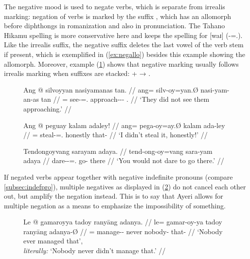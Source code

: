 The negative mood is used to negate verbs, which is separate from irrealis
marking: negation of verbs is marked by the suffix , which has
an allomorph  before diphthongs in romanization and also in
pronunciation. The Tahano Hikamu spelling is more conservative here and keeps
the spelling   for [waɪ]
(\mbox{-\Neg{}=\Fsg{}.\Top{}}). Like the irrealis suffix, the
negative suffix deletes the last vowel of the verb stem if present, which is
exemplified in (\ref{ex:negallo}) besides this example showing the 
allomorph. Moreover, example (\ref{ex:irrneg}) shows that negative marking
usually follows irrealis marking when suffixes are stacked:  +
 → .

\begin{figure}[h]
\pex
\a\label{ex:negative}\begingl
	\gla Ang @ silvoyyan nasiyamanas tan. //
	\glb ang= silv-oy=yan.Ø nasi-yam-an-as tan //
	\glc \AgtT{}= see-\Neg{}=\TplM{}.\Top{} approach-\Ptcp{}-\Nmlz{}-\Parg{} 
		\TplM{}.\Gen{} //
	\glft `They did not see them approaching.' //
\endgl

\a\label{ex:negallo}\begingl
	\gla Ang @ peguay kalam adaley! //
	\glb ang= pega-oy=ay.Ø kalam ada-ley //
	\glc \AgtT{}= steal-\Neg{}=\Fsg{}.\Top{} honestly that-\PargI{} //
	\glft `I didn't steal it, honestly!' //
\endgl

\a\label{ex:irrneg}\begingl
	\gla Tendongoyvang sarayam adaya. //
	\glb tend-ong-oy=vang sara-yam adaya //
	\glc dare-\Irr{}-\Neg{}=\Second{}.\Aarg{} go-\Ptcp{} there //
	\glft `You would not dare to go there.' //
\endgl
\xe
\end{figure}

If negated verbs appear together with negative indefinite pronouns (compare 
\autoref{subsec:indefpro}), multiple negatives as displayed in
(\ref{ex:dblneg}) do not cancel each other out, but amplify the negation
instead. This is to say that Ayeri allows for multiple
negation as a means to emphasize the impossibility of something.

\begin{figure}[h]
\ex\label{ex:dblneg}
\begingl
	\gla Le @ gamaroyya tadoy ranyāng adanya. //
	\glb le= gamar-oy-ya tadoy ranyāng adanya-Ø //
	\glc \PatTI{}= manage-\Neg{}-\TsgM{} never nobody-\Aarg{} that-\Top{} //
	\glft `Nobody ever managed that',\\
		\textit{literally:} `Nobody never didn't manage that.' //
\endgl
\xe
\end{figure}

